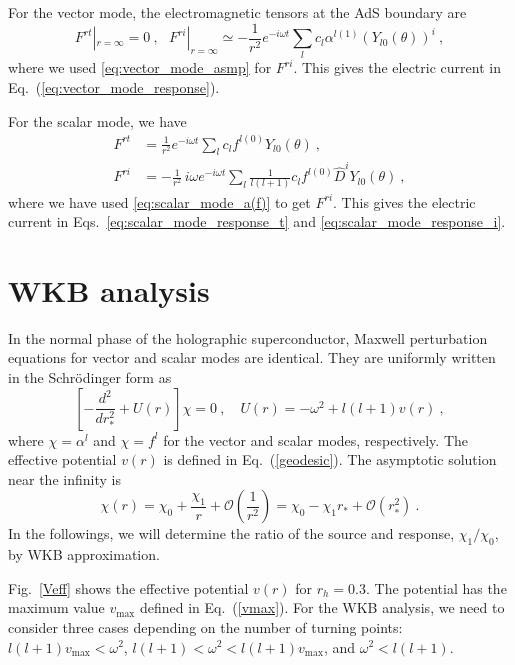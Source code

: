 \documentclass[a4paper,11pt]{article}
\begin{document}
    For the vector mode, the electromagnetic tensors at the AdS boundary are
    \begin{equation}
        F^{rt}|_{r=\infty} = 0\ ,
        \ \ \ 
        F^{ri}|_{r=\infty} \simeq -\frac{1}{r^2} e^{-i\omega t}\sum_l c_l \alpha^{l(1)} (Y_{l0}(\theta))^i\ ,
    \end{equation}
    where we used \eqref{eq:vector_mode_asmp} for $F^{ri}$. This gives the electric current in Eq.~(\ref{eq:vector_mode_response}).

    For the scalar mode, we have
    \begin{align}
        F^{rt}&= \frac{1}{r^2} e^{-i\omega t}\sum_l c_l f^{l(0)} Y_{l0}(\theta)\ ,\\
        F^{ri}&= -\frac{1}{r^2}\, i\omega e^{-i\omega t}\sum_l \frac{1}{l(l+1)} c_l f^{l(0)} \hat{D}^i Y_{l0}(\theta)\ ,
    \end{align}
    where we have used \eqref{eq:scalar_mode_a(f)} to get $F^{ri}$. This gives the electric current in Eqs.~\eqref{eq:scalar_mode_response_t} and \eqref{eq:scalar_mode_response_i}.



\section{WKB analysis}
\label{appendix_WKB}

    In the normal phase of the holographic superconductor, Maxwell perturbation equations for vector and scalar modes are identical.
    They are uniformly written in the Schr\"{o}dinger form as
    \begin{equation}
        \left[-\frac{d^2}{dr_\ast^2}+U(r)\right]\chi=0\ ,\quad U(r)=-\omega^2+l(l+1)v(r)\ ,
        \label{vecmode}
    \end{equation}
    where $\chi=\alpha^l$ and $\chi=f^l$ for the vector and scalar modes, respectively.
    The effective potential $v(r)$ is defined in Eq.~(\ref{geodesic}).
    The asymptotic solution near the infinity is
    \begin{equation}
        \chi(r)=\chi_0 + \frac{\chi_1}{r}+ \mathcal{O}\left(\frac{1}{r^2}\right) = \chi_0 - \chi_1 r_\ast + \mathcal{O}(r_\ast^2)\ .
    \end{equation}
    In the followings, we will determine the ratio of the source and response, $\chi_1/\chi_0$, by WKB approximation. 

    Fig.~\ref{Veff} shows the effective potential $v(r)$ for $r_h=0.3$.
    The potential has the maximum value $v_\textrm{max}$ defined in Eq.~(\ref{vmax}).
    For the WKB analysis, we need to consider three cases depending on the number of turning points:
    $l(l+1) v_\textrm{max} <  \omega^2$, $l(l+1) < \omega^2 < l(l+1) v_\textrm{max}$, and  $\omega^2 < l(l+1)$.
\end{document}
